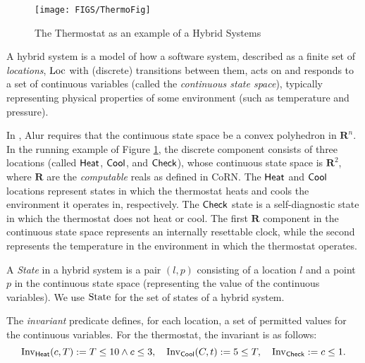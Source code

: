 \documentclass[runningheads]{llncs}
\newcommand{\IR}{{\mathbf R}}
\newcommand{\Heat}{{\sf Heat}}
\newcommand{\Cool}{{\sf Cool}}
\newcommand{\Chec}{{\sf Check}}
\newcommand{\Loc}{{\rm Loc}}
\newcommand{\State}{{\rm State}}
\newcommand{\Inv}{{\rm Inv}}
\begin{document}
\begin{center}
\begin{figure}[htb!]
\begin{center}
    \texttt{[image: FIGS/ThermoFig]}
\end{center}
\caption{The Thermostat as an example of a Hybrid Systems \label{fig:thermostat}}
\end{figure}
\end{center}

A hybrid system is a model of how a software system, described as a
finite set of \emph{locations}, $\Loc$ 
with (discrete) transitions between them, acts
on and responds to a set of continuous variables (called the
\emph{continuous state space}), typically representing physical
properties of some environment (such as temperature and pressure).

In \cite{alur}, Alur requires that the continuous state space be a
convex polyhedron in $\IR^ n$. 
In the running example of Figure \ref{fig:thermostat},
the discrete component consists of three locations (called $\Heat$, $\Cool$,
and $\Chec$), whose continuous state space is $\IR^2$,
where $\IR$ are the \emph{computable} reals as defined in CoRN. 
The $\Heat$ and $\Cool$ locations represent states in which the
thermostat heats and cools the environment it operates in,
respectively. The $\Chec$ state is a self-diagnostic state in which
the thermostat does not heat or cool. The first $\IR$ component in the
continuous state space represents an internally resettable clock,
while the second represents the temperature in the environment in
which the thermostat operates.

A \emph{State} in a hybrid system is a pair $(l, p)$ consisting of a
location $l$ and a point $p$ in the continuous state space
(representing the value of the continuous variables). We use $\State$
for the set of states of a hybrid system.

The {\em invariant\/} predicate defines, for each location, a set of
permitted values for the continuous variables. 
For the thermostat, the invariant is as follows: $$\Inv_{\Heat}(c,T) := T\leq 10\wedge c\leq 3,\quad \Inv_{\Cool}(C,t) := 5 \leq T,\quad \Inv_{\Chec} := c\leq 1.$$
\end{document}

